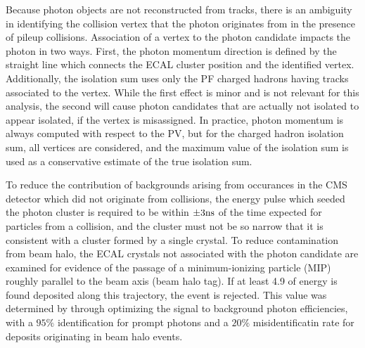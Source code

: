 
Because photon objects are not reconstructed from tracks,
 there is an ambiguity in identifying the collision
 vertex that the photon originates from in the presence 
 of pileup collisions.
Association of a vertex to the photon candidate impacts the photon in two ways. 
First, the photon momentum direction is defined by the
 straight line which connects
 the ECAL cluster position and the identified vertex. 
Additionally, the isolation sum 
 uses only the PF charged hadrons
 having tracks
 associated to the vertex. 
While the first effect is minor and is
 not relevant for this analysis, the second will cause photon
 candidates that are actually not isolated to appear
 isolated, if the 
 vertex is misassigned.  
In practice, photon momentum is always
 computed with respect to the PV,
 but for the charged hadron isolation sum,
 all vertices are considered, and the 
 maximum value of the isolation sum is used as a conservative estimate
 of the true isolation sum.

To reduce the contribution of backgrounds arising from 
 occurances in the CMS detector which did not originate from
 collisions, the energy pulse which seeded the photon cluster
 is required to be within $\pm 3\mathrm{ns}$ of the time expected
 for particles from a collision, and the cluster must not
 be so narrow that it is consistent with a cluster formed by a single crystal.  
To reduce contamination from beam halo, the ECAL
 crystals not  associated with the photon candidate are 
 examined for evidence of the passage of a minimum-ionizing
 particle (MIP) roughly parallel to the beam axis (beam halo tag).
If at least  4.9 \GeV of energy is found deposited along
 this trajectory, the event is rejected.
This value was determined by through optimizing the
 signal to background photon efficiencies, with
 a $95\%$ identification for prompt photons and
 a $20\%$ misidentificatin rate for deposits originating
 in beam halo events.




